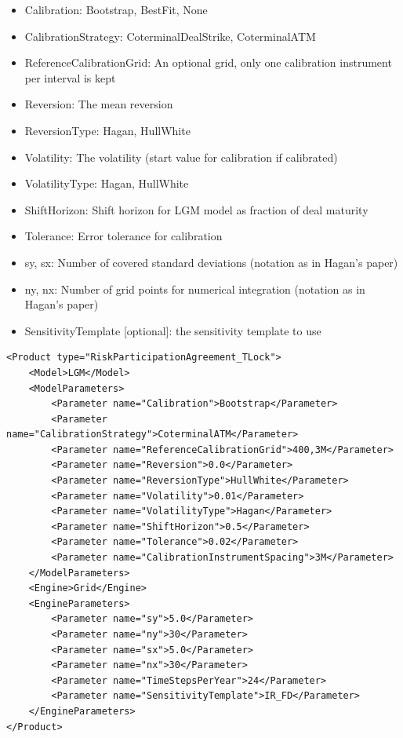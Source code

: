 \begin{itemize}
\item Calibration: Bootstrap, BestFit, None
\item CalibrationStrategy: CoterminalDealStrike, CoterminalATM
\item ReferenceCalibrationGrid: An optional grid, only one calibration instrument per interval is kept
\item Reversion: The mean reversion
\item ReversionType: Hagan, HullWhite
\item Volatility: The volatility (start value for calibration if calibrated)
\item VolatilityType: Hagan, HullWhite
\item ShiftHorizon: Shift horizon for LGM model as fraction of deal maturity
\item Tolerance: Error tolerance for calibration
\item sy, sx: Number of covered standard deviations (notation as in Hagan's paper)
\item ny, nx: Number of grid points for numerical integration (notation as in Hagan's paper)
\item SensitivityTemplate [optional]: the sensitivity template to use
\end{itemize}

\begin{longlisting}
\begin{verbatim}
<Product type="RiskParticipationAgreement_TLock">
    <Model>LGM</Model>
    <ModelParameters>
        <Parameter name="Calibration">Bootstrap</Parameter>
        <Parameter name="CalibrationStrategy">CoterminalATM</Parameter>
        <Parameter name="ReferenceCalibrationGrid">400,3M</Parameter>
        <Parameter name="Reversion">0.0</Parameter>
        <Parameter name="ReversionType">HullWhite</Parameter>
        <Parameter name="Volatility">0.01</Parameter>
        <Parameter name="VolatilityType">Hagan</Parameter>
        <Parameter name="ShiftHorizon">0.5</Parameter>
        <Parameter name="Tolerance">0.02</Parameter>
        <Parameter name="CalibrationInstrumentSpacing">3M</Parameter>
    </ModelParameters>
    <Engine>Grid</Engine>
    <EngineParameters>
        <Parameter name="sy">5.0</Parameter>
        <Parameter name="ny">30</Parameter>
        <Parameter name="sx">5.0</Parameter>
        <Parameter name="nx">30</Parameter>
        <Parameter name="TimeStepsPerYear">24</Parameter>
        <Parameter name="SensitivityTemplate">IR_FD</Parameter>
    </EngineParameters>
</Product>
\end{verbatim}
\caption{Configuration for Product RiskParticipationAgreement\_TLock, Model LGM, Engine Grid}
\label{lst:peconfig_RiskParticipationAgreement_TLock_LGM_Grid}
\end{longlisting}


